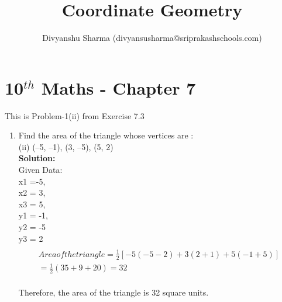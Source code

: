 \documentclass[12pt]{article}
\title{Coordinate Geometry}
\author{Divyanshu Sharma (divyansusharma@sriprakashschools.com)}
\newcommand{\solution}{\noindent \textbf{Solution: }}
\begin{document}
\maketitle
\section*{10$^{th}$ Maths - Chapter 7}
This is Problem-1(ii) from Exercise 7.3
\begin{enumerate}
\item Find the area of the triangle whose vertices are : 
\\ (ii) (–5, –1), (3, –5), (5, 2)
\\\solution \\ 
Given Data: 
\\x1 =-5, 
\\x2 = 3, 
\\x3 = 5, 
\\y1 = -1, 
\\y2 = -5 
\\y3 = 2
\begin{align}
\\Area of the triangle =\frac{1}{2} [-5 { (-5-2)} + 3(2+1) + 5{(-1+5)}]
\\= \frac{1}{2}{(35 + 9 + 20)} = 32
\end{align}
\\Therefore, the area of the triangle is 32 square units.


\end{enumerate}
\end{document}
